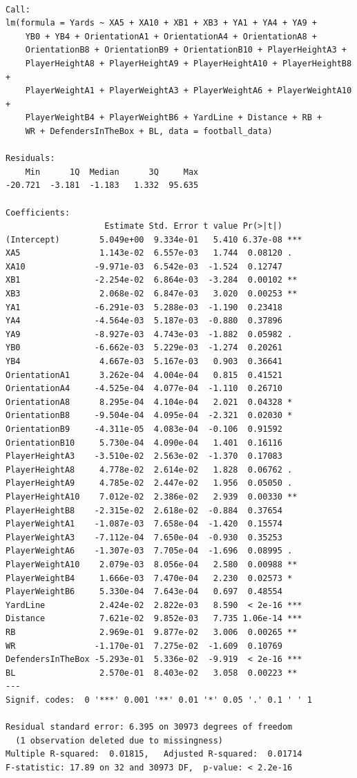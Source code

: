 \documentclass[
  super,
  preprint,
  3p]{elsarticle}
\begin{document}
\begin{verbatim}

Call:
lm(formula = Yards ~ XA5 + XA10 + XB1 + XB3 + YA1 + YA4 + YA9 + 
    YB0 + YB4 + OrientationA1 + OrientationA4 + OrientationA8 + 
    OrientationB8 + OrientationB9 + OrientationB10 + PlayerHeightA3 + 
    PlayerHeightA8 + PlayerHeightA9 + PlayerHeightA10 + PlayerHeightB8 + 
    PlayerWeightA1 + PlayerWeightA3 + PlayerWeightA6 + PlayerWeightA10 + 
    PlayerWeightB4 + PlayerWeightB6 + YardLine + Distance + RB + 
    WR + DefendersInTheBox + BL, data = football_data)

Residuals:
    Min      1Q  Median      3Q     Max 
-20.721  -3.181  -1.183   1.332  95.635 

Coefficients:
                    Estimate Std. Error t value Pr(>|t|)    
(Intercept)        5.049e+00  9.334e-01   5.410 6.37e-08 ***
XA5                1.143e-02  6.557e-03   1.744  0.08120 .  
XA10              -9.971e-03  6.542e-03  -1.524  0.12747    
XB1               -2.254e-02  6.864e-03  -3.284  0.00102 ** 
XB3                2.068e-02  6.847e-03   3.020  0.00253 ** 
YA1               -6.291e-03  5.288e-03  -1.190  0.23418    
YA4               -4.564e-03  5.187e-03  -0.880  0.37896    
YA9               -8.927e-03  4.743e-03  -1.882  0.05982 .  
YB0               -6.662e-03  5.229e-03  -1.274  0.20261    
YB4                4.667e-03  5.167e-03   0.903  0.36641    
OrientationA1      3.262e-04  4.004e-04   0.815  0.41521    
OrientationA4     -4.525e-04  4.077e-04  -1.110  0.26710    
OrientationA8      8.295e-04  4.104e-04   2.021  0.04328 *  
OrientationB8     -9.504e-04  4.095e-04  -2.321  0.02030 *  
OrientationB9     -4.311e-05  4.083e-04  -0.106  0.91592    
OrientationB10     5.730e-04  4.090e-04   1.401  0.16116    
PlayerHeightA3    -3.510e-02  2.563e-02  -1.370  0.17083    
PlayerHeightA8     4.778e-02  2.614e-02   1.828  0.06762 .  
PlayerHeightA9     4.785e-02  2.447e-02   1.956  0.05050 .  
PlayerHeightA10    7.012e-02  2.386e-02   2.939  0.00330 ** 
PlayerHeightB8    -2.315e-02  2.618e-02  -0.884  0.37654    
PlayerWeightA1    -1.087e-03  7.658e-04  -1.420  0.15574    
PlayerWeightA3    -7.112e-04  7.650e-04  -0.930  0.35253    
PlayerWeightA6    -1.307e-03  7.705e-04  -1.696  0.08995 .  
PlayerWeightA10    2.079e-03  8.056e-04   2.580  0.00988 ** 
PlayerWeightB4     1.666e-03  7.470e-04   2.230  0.02573 *  
PlayerWeightB6     5.330e-04  7.643e-04   0.697  0.48554    
YardLine           2.424e-02  2.822e-03   8.590  < 2e-16 ***
Distance           7.621e-02  9.852e-03   7.735 1.06e-14 ***
RB                 2.969e-01  9.877e-02   3.006  0.00265 ** 
WR                -1.170e-01  7.275e-02  -1.609  0.10769    
DefendersInTheBox -5.293e-01  5.336e-02  -9.919  < 2e-16 ***
BL                 2.570e-01  8.403e-02   3.058  0.00223 ** 
---
Signif. codes:  0 '***' 0.001 '**' 0.01 '*' 0.05 '.' 0.1 ' ' 1

Residual standard error: 6.395 on 30973 degrees of freedom
  (1 observation deleted due to missingness)
Multiple R-squared:  0.01815,   Adjusted R-squared:  0.01714 
F-statistic: 17.89 on 32 and 30973 DF,  p-value: < 2.2e-16
\end{verbatim}
\end{document}
